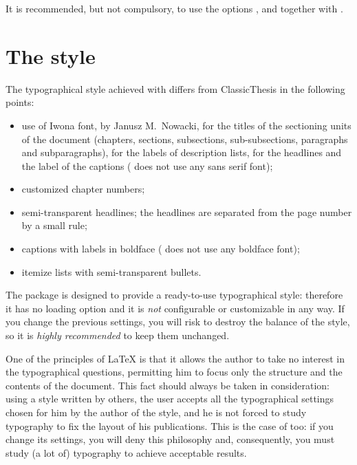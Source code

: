 It is recommended, but not compulsory, to use the options ,  and  together with \arsclassica.






\section{The style}

The typographical style achieved with \arsclassica{} differs from ClassicThesis in the following points:
\begin{itemize}
\item use of Iwona font, by Janusz M.~Nowacki, for the titles of the sectioning units of the document (chapters, sections, subsections, sub-subsections, paragraphs and subparagraphs), for the labels of description lists, for the headlines and the label of the captions (\classicthesis{} does not use any sans serif font);
\item customized chapter numbers;
\item semi-transparent headlines; the headlines are separated from the page number by a small rule;
\item captions with labels in boldface (\classicthesis{} does not use any boldface font);
\item itemize lists with semi-transparent bullets.
\end{itemize}

The \arsclassica{} package is designed  to provide a ready-to-use typographical style: therefore it has no loading option and it is \emph{not} configurable or customizable in any way. If you change the previous settings, you will risk to destroy the balance of the style, so it is \emph{highly recommended} to keep them unchanged.

One of the principles of \LaTeX{} is that it allows the author to take no interest in the typographical questions, permitting him to focus only the structure and the contents of the document. This fact should always be taken in consideration: using a style written by others, the user accepts all the typographical settings chosen for him by the author of the style, and he is not forced to study typography to fix the layout of his publications. This is the case of \arsclassica{} too: if you change its settings, you will deny this philosophy and, consequently, you must study (a lot of) typography to achieve acceptable results.

